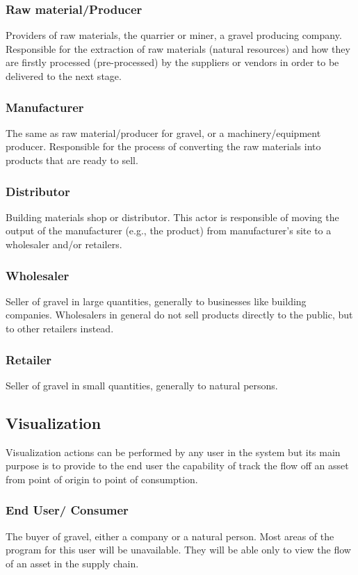 \subsubsection{Raw material/Producer}\label{sec:Rawmaterial}
Providers of raw materials, the quarrier or miner, a gravel producing company. Responsible for the extraction of raw materials (natural resources) and how they are firstly processed (pre-processed) by the suppliers or vendors in order to be delivered to the next stage.

\subsubsection{Manufacturer}\label{sec:Manufacturer}
The same as raw material/producer for gravel, or a machinery/equipment producer. Responsible for the process of converting the raw materials into products that are ready to sell.

\subsubsection{Distributor}\label{sec:Distributor}
Building materials shop or distributor. This actor is responsible of moving the output of the manufacturer (e.g., the product) from manufacturer’s site to a wholesaler and/or retailers.

\subsubsection{Wholesaler}\label{sec:Wholesaler}
Seller of gravel in large quantities, generally to businesses like building companies. Wholesalers in general do not sell products directly to the public, but to other retailers instead.

\subsubsection{Retailer}\label{sec:Retailer}
Seller of gravel in small quantities, generally to natural persons.



\subsection{Visualization}\label{sec:Visualization}

Visualization actions can be performed by any user in the system but its main purpose is to provide to the end user the capability of track the flow off an asset from point of origin to point of consumption.

\subsubsection{End User/ Consumer}\label{sec:EndUser}
The buyer of gravel, either a company or a natural person. Most areas of the program for this user will be unavailable. They will be able only to view the flow of an asset in the supply chain.